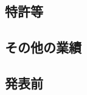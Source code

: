 \documentclass[10pt,a4paper,twoside]{jarticle}
\newcommand{\研究課題名}{XMASS検出器を用いた季節変動による暗黒物質の直接探索}
\newcommand{\研究機関名}{神戸大学}
\newcommand{\申請者氏名}{岡直哉}
\newcommand{\研究代表者氏名}{\申請者氏名}
\newcommand{\研究期間の最終元号年度}{29}	%
\begin{document}
\subsection{特許等}
\newcommand{\特許等}{　なし%
}

\subsection{その他の業績}
\newcommand{\その他の業績}{　なし%
}

\subsection{発表前}
\newcommand{\発表前の業績}{%
}


\end{document}
